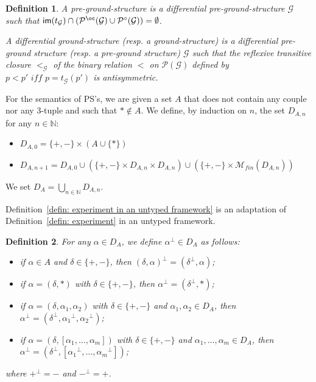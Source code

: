 \documentclass{article}
\newcommand{\target}[1]{t_{#1}}
\theoremstyle{plain}
\newtheorem{definition}{Definition}
\newcommand{\Nat}{\ensuremath{\mathbb{N}}}
\newcommand{\finitemultisets}[1]{\mathcal{M}_\textit{fin}(#1)}
\newcommand{\im}[1]{\textsf{im}(#1)}
\newcommand{\cod}{\oc}
\newcommand{\ports}[1]{\mathcal{P}(#1)}
\newcommand{\portsoftype}[2]{\mathcal{P}^{#1}(#2)}
\begin{document}
\begin{definition}
A \emph{pre-ground-structure} is a differential pre-ground-structure $\mathcal{G}$ such that $\im{\target{\mathcal{G}}} \cap (\portsoftype{\cod}{\mathcal{G}} \cup \portsoftype{\circ}{\mathcal{G}}) = \emptyset$.

A \emph{differential ground-structure} (resp. a \emph{ground-structure}) is a differential pre-ground structure (resp. a pre-ground structure) $\mathcal{G}$ such that the reflexive transitive closure $<_\mathcal{G}$ of the binary relation $<$ on $\ports{\mathcal{G}}$ defined by $p < p' \textit{ iff } p = \target{\mathcal{G}}(p')$ is antisymmetric.
\end{definition}

For the semantics of PS's, we are given a set $A$ that does not contain any couple nor any $3$-tuple and such that $\ast \notin A$. We define, by induction on $n$, the set $D_{A, n}$ for any $n \in \Nat$:
\begin{itemize}
\item $D_{A, 0} = \{ +, - \} \times (A \cup \{ \ast \})$
\item $D_{A, n+1} = D_{A, 0} \cup (\{ +, - \} \times D_{A, n} \times D_{A, n}) \cup (\{ +, - \} \times \finitemultisets{D_{A, n}})$
\end{itemize}
We set $D_A = \bigcup_{n \in \Nat} D_{A, n}$.

Definition~\ref{defin: experiment in an untyped framework} is an adaptation of Definition~\ref{defin: experiment} in an untyped framework.

\begin{definition}
For any $\alpha \in D_A$, we define $\alpha^\perp \in D_A$ as follows:
\begin{itemize}
\item if $\alpha \in A$ and $\delta \in \{ +, - \}$, then $(\delta, \alpha)^\perp = (\delta^\perp, \alpha)$;
\item if $\alpha = (\delta, \ast)$ with $\delta \in \{ +, - \}$, then $\alpha^\perp = (\delta^\perp, \ast)$;
\item if $\alpha = (\delta, \alpha_1, \alpha_2)$ with $\delta \in \{ +, - \}$ and $\alpha_1, \alpha_2 \in D_A$, then $\alpha^\perp = (\delta^\perp, {\alpha_1}^\perp, {\alpha_2}^\perp)$;
\item if $\alpha = (\delta, [\alpha_1, \ldots, \alpha_m])$ with $\delta \in \{ +, - \}$ and $\alpha_1, \ldots, \alpha_m \in D_A$, then $\alpha^\perp = (\delta^\perp, [{\alpha_1}^\perp, \ldots, {\alpha_m}^\perp])$;
\end{itemize}
where $+^\perp = -$ and $-^\perp = +$.
\end{definition}
\end{document}
